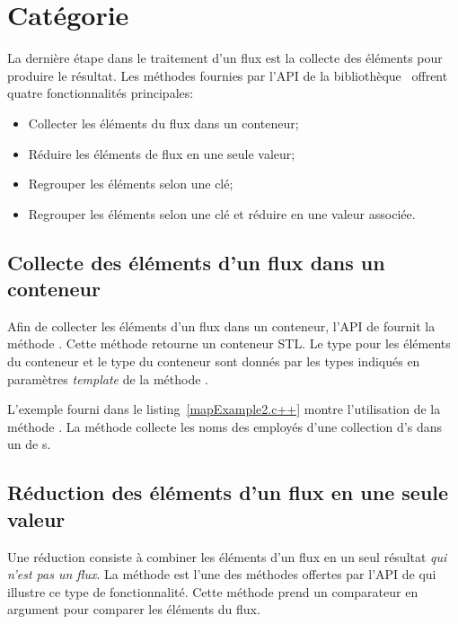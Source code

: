 \section{Cat\'egorie }

\label{aggregation.sect}

La derni\`ere \'etape dans le traitement d'un flux est la collecte des \'el\'ements pour produire le r\'esultat. Les m\'ethodes fournies par l'API de la biblioth\`eque \ppff\ offrent quatre fonctionnalit\'es principales: 


\begin{itemize}
	\item Collecter les \'el\'ements du flux dans un conteneur;	

	\item R\'eduire les \'el\'ements de flux en une seule valeur;

	\item Regrouper les \'el\'ements selon une cl\'e;
	
	\item Regrouper les \'el\'ements selon une cl\'e et r\'eduire en une valeur associ\'ee.
\end{itemize}


\subsection{Collecte des \'el\'ements d'un flux dans un conteneur}

Afin de collecter les \'el\'ements d'un flux dans un conteneur, l'{API} de  fournit la m\'ethode . Cette m\'ethode retourne un conteneur {STL}. Le type pour les \'el\'ements du conteneur et le type du conteneur sont donn\'es par les types indiqu\'es en param\`etres \emph{template} de la m\'ethode . 

L'exemple fourni dans le listing~\ref{mapExample2.c++} montre l'utilisation de la m\'ethode . La m\'ethode collecte les noms des employ\'es d'une collection d's dans un  de s.


\subsection{R\'eduction des \'el\'ements d'un flux en une seule valeur}

Une r\'eduction
consiste \`a combiner les \'el\'ements d'un flux en un seul r\'esultat \emph{qui n'est pas un flux}. La m\'ethode   est l'une des m\'ethodes offertes par l'{API} de  qui illustre ce type de fonctionnalit\'e. Cette m\'ethode prend un comparateur en argument pour comparer les \'el\'ements du flux. 


